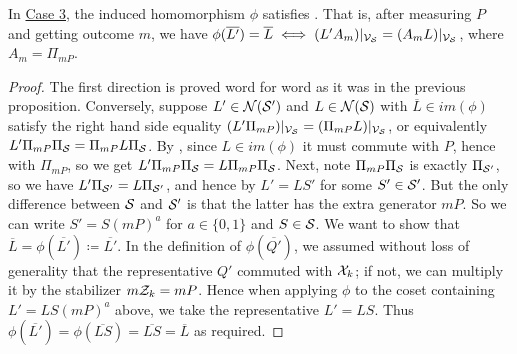 \begin{proposition}
    In \hyperref[thm:stabilizer_group_update_measurement:case3]{Case 3}, the induced homomorphism $\phi$ satisfies .
    That is, after measuring $P$ and getting outcome $m$, we have $\phi(\overline{L'}) = \overline{L} \iff (L' A_m)|_{\mathcal{V}_{\mathcal{S}}} = (A_m L)|_{\mathcal{V}_{\mathcal{S}}}$, where $A_m = \Pi_{mP}$.
    \begin{proof}
        The first direction is proved word for word as it was in the previous proposition.
        Conversely, suppose $L' \in \mathcal{N}(\mathcal{S}')$ and $L \in \mathcal{N}(\mathcal{S})$ with $\overline{L} \in im(\phi)$ satisfy the right hand side equality $(L' \Pi_{mP})|_{\mathcal{V}_{\mathcal{S}}} = (\Pi_{mP} L)|_{\mathcal{V}_{\mathcal{S}}}$, or equivalently $L' \Pi_{mP} \Pi_{\mathcal{S}} = \Pi_{mP} L \Pi_{\mathcal{S}}$.
        By , since $L \in im(\phi)$ it must commute with $P$, hence with $\Pi_{mP}$, so we get $L' \Pi_{mP} \Pi_{\mathcal{S}} = L \Pi_{mP} \Pi_{\mathcal{S}}$.
        Next, note $\Pi_{mP} \Pi_{\mathcal{S}}$ is exactly $\Pi_{\mathcal{S}'}$, so we have $L' \Pi_{\mathcal{S}'} = L \Pi_{\mathcal{S}'}$, and hence by  $L' = LS'$ for some $S' \in \mathcal{S}'$.
        But the only difference between $\mathcal{S}$ and $\mathcal{S}'$ is that the latter has the extra generator $mP$.
        So we can write $S' = S(mP)^a$ for $a \in \{0, 1\}$ and $S \in \mathcal{S}$.
        We want to show that $\overline{L} = \phi(\overline{L'}) \coloneqq \overline{L'}$.
        In the definition of $\phi(\overline{Q'})$, we assumed without loss of generality that the representative $Q'$ commuted with $\mathcal{X}_k$; if not, we can multiply it by the stabilizer $m\mathcal{Z}_k = mP$.
        Hence when applying $\phi$ to the coset containing $L' = LS(mP)^a$ above, we take the representative $L' = LS$.
        Thus $\phi(\overline{L'}) = \phi(\overline{LS}) = \overline{LS} = \overline{L}$ as required.
    \end{proof}
\end{proposition}

